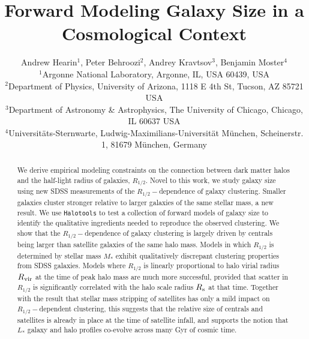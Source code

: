 \documentclass[usenatbib,usegraphicx,letterpaper]{mn2e}
\newcommand{\rhalf}{R_{1/2}}
\newcommand{\mstar}{M_{\ast}}
\newcommand{\rvir}{R_{\rm vir}}
\begin{document}
\title[Forward Modeling Galaxy Size]
{Forward Modeling Galaxy Size in a Cosmological Context}


\author[Hearin, Behroozi, Kravtsov \& Moster]{
Andrew Hearin$^{1}$, Peter Behroozi$^{2}$, Andrey Kravtsov$^{3}$, Benjamin Moster$^{4}$\\
$^{1}$Argonne National Laboratory, Argonne, IL, USA 60439, USA\\
$^{2}$Department of Physics, University of Arizona, 1118 E 4th St, Tucson, AZ 85721 USA\\
$^{3}$Department of Astronomy \& Astrophysics, The University of Chicago, Chicago, IL 60637 USA\\
$^{4}$Universit{\"a}ts-Sternwarte, Ludwig-Maximilians-Universit{\"a}t M{\"u}nchen, Scheinerstr. 1, 81679 M{\"u}nchen, Germany
}

\maketitle

\begin{abstract}
We derive empirical modeling constraints on the connection between dark matter halos and the half-light radius of galaxies, $\rhalf.$ Novel to this work, we study galaxy size using new SDSS measurements of the $\rhalf-$dependence of galaxy clustering. Smaller galaxies cluster stronger relative to larger galaxies of the same stellar mass, a new result. We use {\tt Halotools} to test a collection of forward models of galaxy size to identify the qualitative ingredients needed to reproduce the observed clustering. We show that the $\rhalf-$dependence of galaxy clustering is largely driven by centrals being larger than satellite galaxies of the same halo mass. Models in which $\rhalf$ is determined by stellar mass $\mstar$ exhibit qualitatively discrepant clustering properties from SDSS galaxies. Models where $\rhalf$ is linearly proportional to halo virial radius $\rvir$ at the time of peak halo mass are much more successful, provided that scatter in $\rhalf$ is significantly correlated with the halo scale radius $R_{\rm s}$ at that time. Together with the result that stellar mass stripping of satellites has only a mild impact on $\rhalf-$dependent clustering, this suggests that the relative size of centrals and satellites is already in place at the time of satellite infall, and supports the notion that $L_{\ast}$ galaxy and halo profiles co-evolve across many Gyr of cosmic time.
\end{abstract}
\end{document}
